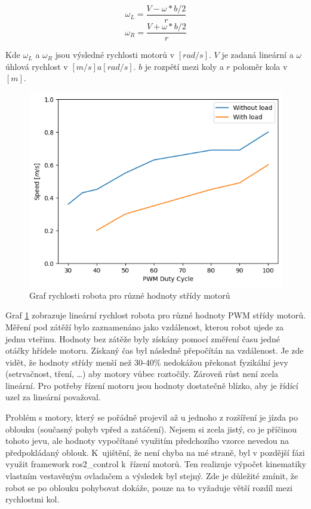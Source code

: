 \begin{equation}
	\omega_L = \frac{V - \omega * b/2}{r}
\end{equation}
\begin{equation}
	\omega_R = \frac{V + \omega * b/2}{r}
\end{equation}

\noindent Kde $\omega_L$ a $\omega_R$ jsou výsledné rychlosti motorů v $[rad/s]$. $V$ je zadaná lineární a $\omega$ úhlová rychlost v $[m/s] a [rad/s]$. $b$ je rozpětí mezi koly a $r$ poloměr kola v $[m]$. \cite{diff_drive}

\begin{figure}[h!]
	\centering
	\includegraphics[scale=0.75]{obrazky-figures/motors_graph.png}
	\caption{Graf rychlosti robota pro různé hodnoty střídy motorů}
	\label{fig:motor_pwm_graph}
\end{figure}
Graf \ref{fig:motor_pwm_graph} zobrazuje lineární rychlost robota pro různé hodnoty PWM střídy motorů. Měření pod zátěží bylo zaznamenáno jako vzdálenost, kterou robot ujede za jednu vteřinu. Hodnoty bez zátěže byly získány pomocí změření času jedné otáčky hřídele motoru. Získaný čas byl následně přepočítán na vzdálenost. Je zde vidět, že hodnoty střídy menší než 30-40\% nedokážou překonat fyzikální jevy (setrvačnost, tření, \dots) aby motory vůbec roztočily. Zároveň růst není zcela lineární. Pro potřeby řízení motoru jsou hodnoty dostatečně blízko, aby je řídící uzel za lineární považoval.

Problém s motory, který se pořádně projevil až u jednoho z rozšíření je jízda po oblouku (současný pohyb vpřed a zatáčení). Nejsem si zcela jistý, co je příčinou tohoto jevu, ale hodnoty vypočítané využitím předchozího vzorce nevedou na předpokládaný oblouk. K~ujištění, že není chyba na mé straně, byl v pozdější fázi využit framework ros2\_control k~řízení motorů. Ten realizuje výpočet kinematiky vlastním vestavěným ovladačem a výsledek byl stejný. Zde je důležité zmínit, že robot se po oblouku pohybovat dokáže, pouze na to vyžaduje větší rozdíl mezi rychlostmi kol.

